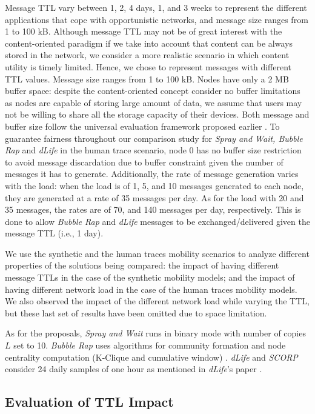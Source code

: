 \documentclass[lnicst]{svmultln}
\begin{document}
Message TTL vary between 1, 2, 4 days, 1, and 3 weeks to represent
the different applications that cope with opportunistic networks,
and message size ranges from 1 to 100 kB. Although message TTL may
not be of great interest with the content-oriented paradigm if we
take into account that content can be always stored in the network,
we consider a more realistic scenario in which content utility is
timely limited. Hence, we chose to represent messages with different
TTL values. Message size ranges from 1 to 100 kB. Nodes have only
a 2 MB buffer space: despite the content-oriented concept consider
no buffer limitations as nodes are capable of storing large amount
of data, we assume that users may not be willing to share all the
storage capacity of their devices. Both message and buffer size follow
the universal evaluation framework proposed earlier \cite{latincom}.
To guarantee fairness throughout our comparison study for \emph{Spray
and Wait, Bubble Rap }and\emph{ dLife} in the human trace scenario,
node 0 has no buffer size restriction to avoid message discardation
due to buffer constraint given the number of messages it has to generate.
Additionally, the rate of message generation varies with the load:
when the load is of 1, 5, and 10 messages generated to each node,
they are generated at a rate of 35 messages per day. As for the load
with 20 and 35 messages, the rates are of 70, and 140 messages per
day, respectively. This is done to allow \emph{Bubble Rap} and \emph{dLife
}messages to be exchanged/delivered given the message TTL (i.e., 1
day).

We use the synthetic and the human traces mobility scenarios to analyze
different properties of the solutions being compared: the impact of
having different message TTLs in the case of the synthetic mobility
models; and the impact of having different network load in the case
of the human traces mobility models. We also observed the impact of
the different network load while varying the TTL, but these last set
of results have been omitted due to space limitation.

As for the proposals, \emph{Spray and Wait} runs in binary mode with
number of copies $L$ set to 10. \emph{Bubble Rap} uses algorithms
for community formation and node centrality computation (K-Clique
and cumulative window) \cite{bubble2011}. \emph{dLife }and \emph{SCORP}
consider 24 daily samples of one hour as mentioned in \emph{dLife}'s
paper \cite{dlife}.


\subsection{Evaluation of TTL Impact \label{sub:TTL-Impact-Evaluation}}
\end{document}
